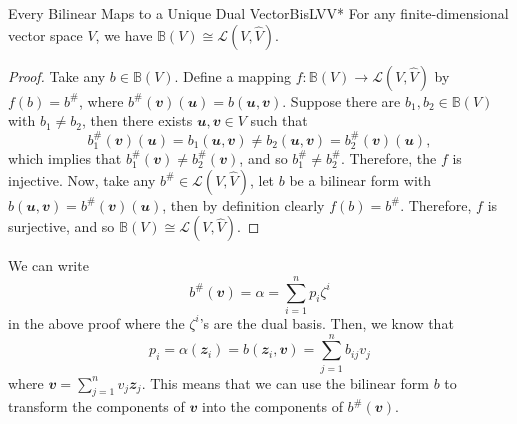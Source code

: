\documentclass[math, code]{amznotes}
\theoremstyle{remark}
\begin{document}
\begin{probox}{Every Bilinear Maps to a Unique Dual Vector}{BisLVV*}
    For any finite-dimensional vector space $V$, we have $\mathbb{B}(V) \cong \mathcal{L}\left(V, \widehat{V}\right)$.
    \tcblower
    \begin{proof}
        Take any $b \in \mathbb{B}(V)$. Define a mapping $f \colon \mathbb{B}(V) \to  \mathcal{L}\left(V, \widehat{V}\right)$ by $f(b) = b^{\#}$, where $b^{\#}(\mathbfit{v})(\mathbfit{u}) = b(\mathbfit{u}, \mathbfit{v})$. Suppose there are $b_1, b_2 \in \mathbb{B}(V)$ with $b_1 \neq b_2$, then there exists $\mathbfit{u}, \mathbfit{v} \in V$ such that 
        \begin{equation*}
            b_1^{\#}(\mathbfit{v})(\mathbfit{u}) = b_1(\mathbfit{u}, \mathbfit{v}) \neq b_2(\mathbfit{u}, \mathbfit{v}) = b_2^{\#}(\mathbfit{v})(\mathbfit{u}),
        \end{equation*}
        which implies that $b_1^{\#}(\mathbfit{v}) \neq b_2^{\#}(\mathbfit{v})$, and so $b_1^{\#} \neq b_2^{\#}$. Therefore, the $f$ is injective. Now, take any $b^{\#} \in \mathcal{L}\left(V, \widehat{V}\right)$, let $b$ be a bilinear form with $b(\mathbfit{u}, \mathbfit{v}) = b^{\#}(\mathbfit{v})(\mathbfit{u})$, then by definition clearly $f(b) = b^{\#}$. Therefore, $f$ is surjective, and so $\mathbb{B}(V) \cong \mathcal{L}\left(V, \widehat{V}\right)$.
    \end{proof}
\end{probox}
We can write 
\begin{equation*}
    b^{\#}(\mathbfit{v}) = \alpha = \sum_{i = 1}^{n}p_i\zeta^i
\end{equation*}
in the above proof where the $\zeta^i$'s are the dual basis. Then, we know that 
\begin{equation*}
    p_i = \alpha\left(\mathbfit{z}_i\right) = b\left(\mathbfit{z}_i, \mathbfit{v}\right) = \sum_{j = 1}^{n}b_{ij}v_j
\end{equation*}
where $\mathbfit{v} = \sum_{j = 1}^{n}v_j\mathbfit{z}_j$. This means that we can use the bilinear form $b$ to transform the components of $\mathbfit{v}$ into the components of $b^{\#}(\mathbfit{v})$.
\end{document}
